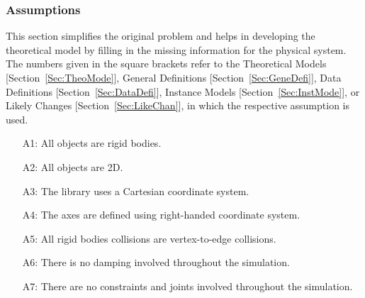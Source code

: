 \documentclass[12pt]{article}
\begin{document}
\subsubsection{Assumptions}
\label{Sec:Assu}
This section simplifies the original problem and helps in developing the theoretical model by filling in the missing information for the physical system. The numbers given in the square brackets refer to the Theoretical Models [Section~\ref{Sec:TheoMode}], General Definitions [Section~\ref{Sec:GeneDefi}], Data Definitions [Section~\ref{Sec:DataDefi}], Instance Models [Section~\ref{Sec:InstMode}], or Likely Changes [Section~\ref{Sec:LikeChan}], in which the respective assumption is used.
\begin{itemize}
\item[A1:]All objects are rigid bodies.
\item[A2:]All objects are 2D.
\item[A3:]The library uses a Cartesian coordinate system.
\item[A4:]The axes are defined using right-handed coordinate system.
\item[A5:]All rigid bodies collisions are vertex-to-edge collisions.
\item[A6:]There is no damping involved throughout the simulation.
\item[A7:]There are no constraints and joints involved throughout the simulation.
\end{itemize}
\end{document}
